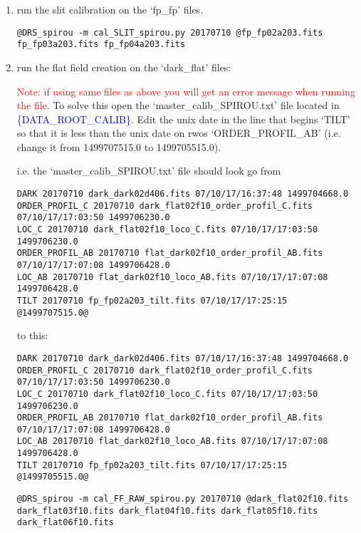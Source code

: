 \begin{enumerate}
\item run the slit calibration on the `fp\_fp' files.
\begin{lstlisting}[style=bashstyle]
@DRS_spirou -m cal_SLIT_spirou.py 20170710 @fp_fp02a203.fits fp_fp03a203.fits fp_fp04a203.fits
\end{lstlisting}  

\item run the flat field creation on the `dark\_flat' files:

\noindent \textcolor{red}{Note: if using same files as above you will get an error message when running the file}.
\noindent To solve this open the `master\_calib\_SPIROU.txt' file located in \textcolor{blue}{\{DATA\_ROOT\_CALIB\}}. Edit the unix date in the line that begins `TILT' so that it is less than the unix date on rwos `ORDER\_PROFIL\_AB' (i.e. change it from 1499707515.0 to 1499705515.0).

\noindent i.e. the `master\_calib\_SPIROU.txt' file should look go from
\begin{lstlisting}[style=text]
DARK 20170710 dark_dark02d406.fits 07/10/17/16:37:48 1499704668.0
ORDER_PROFIL_C 20170710 dark_flat02f10_order_profil_C.fits 07/10/17/17:03:50 1499706230.0
LOC_C 20170710 dark_flat02f10_loco_C.fits 07/10/17/17:03:50 1499706230.0
ORDER_PROFIL_AB 20170710 flat_dark02f10_order_profil_AB.fits 07/10/17/17:07:08 1499706428.0
LOC_AB 20170710 flat_dark02f10_loco_AB.fits 07/10/17/17:07:08 1499706428.0
TILT 20170710 fp_fp02a203_tilt.fits 07/10/17/17:25:15 @1499707515.0@
\end{lstlisting}

\noindent to this:

\begin{lstlisting}[style=text]
DARK 20170710 dark_dark02d406.fits 07/10/17/16:37:48 1499704668.0
ORDER_PROFIL_C 20170710 dark_flat02f10_order_profil_C.fits 07/10/17/17:03:50 1499706230.0
LOC_C 20170710 dark_flat02f10_loco_C.fits 07/10/17/17:03:50 1499706230.0
ORDER_PROFIL_AB 20170710 flat_dark02f10_order_profil_AB.fits 07/10/17/17:07:08 1499706428.0
LOC_AB 20170710 flat_dark02f10_loco_AB.fits 07/10/17/17:07:08 1499706428.0
TILT 20170710 fp_fp02a203_tilt.fits 07/10/17/17:25:15 @1499705515.0@

\end{lstlisting}

\begin{lstlisting}[style=bashstyle]
@DRS_spirou -m cal_FF_RAW_spirou.py 20170710 @dark_flat02f10.fits dark_flat03f10.fits dark_flat04f10.fits dark_flat05f10.fits dark_flat06f10.fits
\end{lstlisting}  


\end{enumerate}

